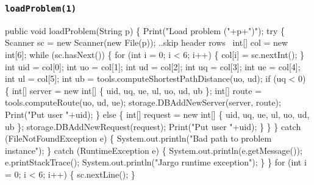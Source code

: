 \documentclass{article}
\def\nwendcode{\endtrivlist \endgroup}      %
\let\nwdocspar=\par
\begin{document}
\subsubsection{{\tt{}\protect{}loadProblem(1)}}
\nwenddocs{}\endmoddef{}
public void loadProblem(String p) \{
  Print("Load problem ("+p+")");
  try \{
    Scanner sc = new Scanner(new File(p));
    \LA{}..skip header rows~{\nwtagstyle{}}\RA{}
    int[] col = new int[6];
    while (sc.hasNext()) \{
      for (int i = 0; i < 6; i++) \{
        col[i] = sc.nextInt();
      \}
      int uid = col[0];
      int uo = col[1];
      int ud = col[2];
      int uq = col[3];
      int ue = col[4];
      int ul = col[5];
      int ub = tools.computeShortestPathDistance(uo, ud);
      if (uq < 0) \{
        int[] server = new int[] \{ uid, uq, ue, ul, uo, ud, ub \};
        int[] route = tools.computeRoute(uo, ud, ue);
        storage.DBAddNewServer(server, route);
        Print("Put user "+uid);
      \} else \{
        int[] request = new int[] \{ uid, uq, ue, ul, uo, ud, ub \};
        storage.DBAddNewRequest(request);
        Print("Put user "+uid);
      \}
    \}
  \} catch (FileNotFoundException e) \{
    System.out.println("Bad path to problem instance");
  \} catch (RuntimeException e) \{
    System.out.println(e.getMessage());
    e.printStackTrace();
    System.out.println("Jargo runtime exception");
  \}
\}
\eatline
{}\nwendcode{}\endmoddef{}
for (int i = 0; i < 6; i++) \{
  sc.nextLine();
\}
\nwendcode{}\nwdocspar
\end{document}
